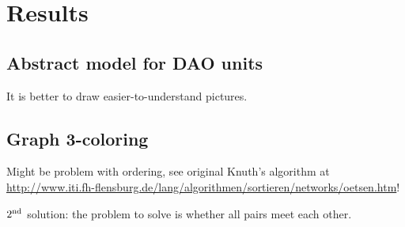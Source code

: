 \chapter{Results}

\section{Abstract model for DAO units}

It is better to draw easier-to-understand pictures.

\section{Graph 3-coloring}

Might be problem with ordering, see original Knuth's algorithm at \url{http://www.iti.fh-flensburg.de/lang/algorithmen/sortieren/networks/oetsen.htm}!

$2^{\textnormal{nd}}$ solution: the problem to solve is whether all pairs meet each other.